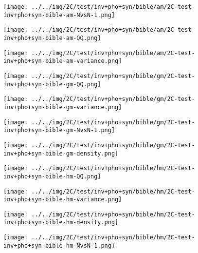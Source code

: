 \begin{figure}[H]
\centering	\texttt{[image: ../../img/2C/test/inv+pho+syn/bible/am/2C-test-inv+pho+syn-bible-am-NvsN-1.png]}
\end{figure}
\begin{figure}[H]
\centering	\texttt{[image: ../../img/2C/test/inv+pho+syn/bible/am/2C-test-inv+pho+syn-bible-am-QQ.png]}
\end{figure}
\begin{figure}[H]
\centering	\texttt{[image: ../../img/2C/test/inv+pho+syn/bible/am/2C-test-inv+pho+syn-bible-am-variance.png]}
\end{figure}
\begin{figure}[H]
\centering	\texttt{[image: ../../img/2C/test/inv+pho+syn/bible/gm/2C-test-inv+pho+syn-bible-gm-QQ.png]}
\end{figure}
\begin{figure}[H]
\centering	\texttt{[image: ../../img/2C/test/inv+pho+syn/bible/gm/2C-test-inv+pho+syn-bible-gm-variance.png]}
\end{figure}
\begin{figure}[H]
\centering	\texttt{[image: ../../img/2C/test/inv+pho+syn/bible/gm/2C-test-inv+pho+syn-bible-gm-NvsN-1.png]}
\end{figure}
\begin{figure}[H]
\centering	\texttt{[image: ../../img/2C/test/inv+pho+syn/bible/gm/2C-test-inv+pho+syn-bible-gm-density.png]}
\end{figure}
\begin{figure}[H]
\centering	\texttt{[image: ../../img/2C/test/inv+pho+syn/bible/hm/2C-test-inv+pho+syn-bible-hm-QQ.png]}
\end{figure}
\begin{figure}[H]
\centering	\texttt{[image: ../../img/2C/test/inv+pho+syn/bible/hm/2C-test-inv+pho+syn-bible-hm-variance.png]}
\end{figure}
\begin{figure}[H]
\centering	\texttt{[image: ../../img/2C/test/inv+pho+syn/bible/hm/2C-test-inv+pho+syn-bible-hm-density.png]}
\end{figure}
\begin{figure}[H]
\centering	\texttt{[image: ../../img/2C/test/inv+pho+syn/bible/hm/2C-test-inv+pho+syn-bible-hm-NvsN-1.png]}
\end{figure}
